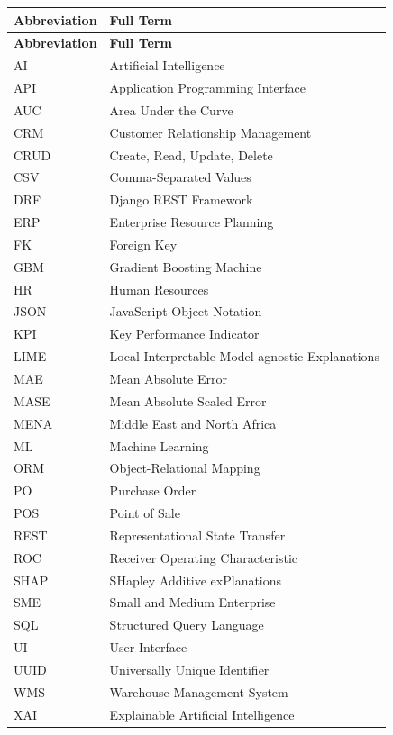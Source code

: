 \documentclass[12pt,a4paper]{report}
\begin{document}
\begin{longtable}{@{} l p{10cm} @{}}
\toprule
\textbf{Abbreviation} & \textbf{Full Term} \\
\midrule
\endfirsthead
\toprule
\textbf{Abbreviation} & \textbf{Full Term} \\
\midrule
\endhead
AI      & Artificial Intelligence \\
API     & Application Programming Interface \\
AUC     & Area Under the Curve \\
CRM     & Customer Relationship Management \\
CRUD    & Create, Read, Update, Delete \\
CSV     & Comma-Separated Values \\
DRF     & Django REST Framework \\
ERP     & Enterprise Resource Planning \\
FK      & Foreign Key \\
GBM     & Gradient Boosting Machine \\
HR      & Human Resources \\
JSON    & JavaScript Object Notation \\
KPI     & Key Performance Indicator \\
LIME    & Local Interpretable Model-agnostic Explanations \\
MAE     & Mean Absolute Error \\
MASE    & Mean Absolute Scaled Error \\
MENA    & Middle East and North Africa \\
ML      & Machine Learning \\
ORM     & Object-Relational Mapping \\
PO      & Purchase Order \\
POS     & Point of Sale \\
REST    & Representational State Transfer \\
ROC     & Receiver Operating Characteristic \\
SHAP    & SHapley Additive exPlanations \\
SME     & Small and Medium Enterprise \\
SQL     & Structured Query Language \\
UI      & User Interface \\
UUID    & Universally Unique Identifier \\
WMS     & Warehouse Management System \\
XAI     & Explainable Artificial Intelligence \\
\bottomrule
\end{longtable}
\end{document}
